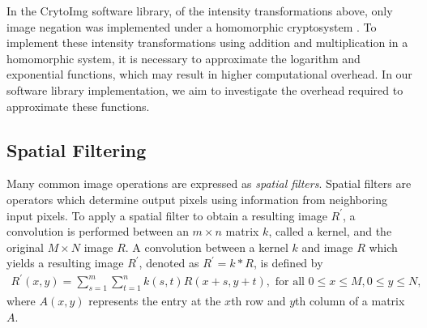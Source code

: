 In the CrytoImg software library, of the intensity transformations above, only image negation was implemented under a homomorphic cryptosystem \cite{ziad_cryptoimg}. To implement these intensity transformations using addition and multiplication in a homomorphic system, it is necessary to approximate the logarithm and exponential functions, which may result in higher computational overhead. In our software library implementation, we aim to investigate the overhead required to approximate these functions.

\subsection{Spatial Filtering}
Many common image operations are expressed as \textit{spatial filters}. Spatial filters are operators which determine output pixels using information from neighboring input pixels. To apply a spatial filter to obtain a resulting image $R^\prime$, a convolution is performed between an $m \times n$ matrix $k$, called a kernel, and the original $M\times N$ image $R$.
A convolution between a kernel $k$ and image $R$ which yields a resulting image $R^\prime$, denoted as $R^\prime = k \ast R$, is defined by
\begin{align} \label{eq:spatialfilter}
	R^\prime(x,y) = \sum_{s=1}^m{\sum_{t=1}^n{k(s,t)R(x+s,y+t)}}, \text{ for all } 0\leq x \leq M, 0 \leq y \leq N,
\end{align}
where $A(x,y)$ represents the entry at the $x$th row and $y$th column of a matrix $A$.

